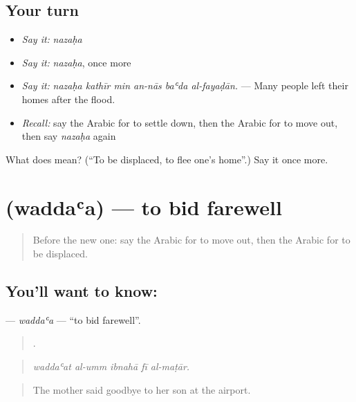 \subsection*{Your turn}
\begin{itemize}
\raggedright
  \item \emph{Say it:} \emph{nazaḥa}
  \item \emph{Say it:} \emph{nazaḥa}, once more
  \item \emph{Say it:} \emph{nazaḥa kathīr min an-nās baʿda al-fayaḍān.} — Many people left their homes after the flood.
  \item \emph{Recall:} say the Arabic for to settle down, then the Arabic for to move out, then say \emph{nazaḥa} again
\end{itemize}

\begin{tcolorbox}[breakable,colback=teal!4,colframe=teal!35!black,title={Before you move on}]
What does  mean? (\textquotedblleft{}To be displaced, to flee one’s home\textquotedblright{}.) Say it once more.
\end{tcolorbox}
\section[\texorpdfstring{\ar{ودع} (waddaʿa)}{ودع (waddaʿa)}]{ (waddaʿa) — to bid farewell}

\label{lesson:AR-C332-waddaa}



\begin{quote}
Before the new one: say the Arabic for to move out, then the Arabic for to be displaced.
\end{quote}

\subsection*{You'll want to know: }
\textbf{} — \emph{waddaʿa} — \textquotedblleft{}to bid farewell\textquotedblright{}.

\begin{quote}
    .
\end{quote}

\begin{quote}
\emph{waddaʿat al-umm ibnahā fī al-maṭār.}
\end{quote}

\begin{quote}
The mother said goodbye to her son at the airport.
\end{quote}

